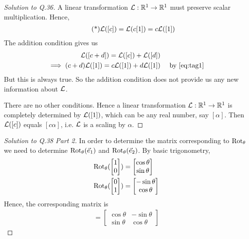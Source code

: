 \begin{proof}[Solution to Q.36]
  A linear transformation $\mathcal{L}: \mathbb{R}^1 \rightarrow \mathbb{R}^1$ must preserve scalar multiplication.
  Hence,
  \begin{align}
    \label{eq:tag1}
    \tag{*}
    \mathcal{L}([c]) = \mathcal{L}(c[1]) = c \mathcal{L}([1])
  \end{align}
  The addition condition gives us
  \begin{align*}
    \mathcal{L}([c + d]) = \mathcal{L}([c]) + \mathcal{L}([d]) \\
    \implies (c+d) \mathcal{L}([1]) = c \mathcal{L}([1]) + d \mathcal{L}([1]) && \mbox{ by \eqref{eq:tag1}}
  \end{align*}
  But this is always true. So the addition condition does not provide us any new information about $\mathcal{L}$.

  There are no other conditions. Hence a linear transformation $\mathcal{L}: \mathbb{R}^1 \rightarrow \mathbb{R}^1$ is completely determined by $\mathcal{L}([1])$, which can be any real number, say $[\alpha]$.
  Then $\mathcal{L}([c])$ equals $ [c\alpha]$, i.e. $\mathcal{L}$ is a scaling by $\alpha$.
\end{proof}

\begin{proof}[Solution to Q.38 Part 2]
  In order to determine the matrix corresponding to $\mathrm{Rot}_{\theta}$ we need to determine $\mathrm{Rot}_{\theta}(\vec{e}_1)$ and $\mathrm{Rot}_{\theta}(\vec{e}_2)$.
  By basic trigonometry,
  \begin{align*}
    \mathrm{Rot}_{\theta}(\begin{bmatrix} 1 \\ 0 \end{bmatrix}) &= \begin{bmatrix} \cos \theta \\ \sin \theta \end{bmatrix}\\
    \mathrm{Rot}_{\theta}(\begin{bmatrix} 0 \\ 1 \end{bmatrix}) &= \begin{bmatrix} -\sin \theta \\ \cos \theta \end{bmatrix}
  \end{align*}
  Hence, the corresponding matrix is
  \begin{align*}
    [\rot] = \begin{bmatrix} \cos \theta & - \sin \theta \\ \sin \theta & \cos \theta \end{bmatrix}
  \end{align*}
\end{proof}

